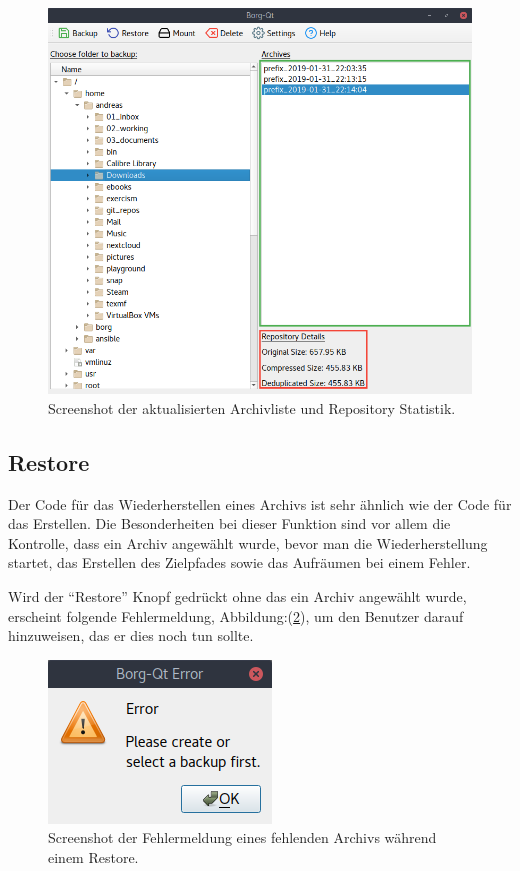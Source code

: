 \begin{figure}[htbp]
\centering
\includegraphics[width=.9\linewidth]{pictures/borgqt_archive_list.png}
\caption{\label{fig:org24ed7cf}
Screenshot der aktualisierten Archivliste und Repository Statistik.}
\end{figure}

\subsection{Restore}
\label{sec:org5c152c9}

Der Code für das Wiederherstellen eines Archivs ist sehr ähnlich wie der Code
für das Erstellen. Die Besonderheiten bei dieser Funktion sind vor allem die
Kontrolle, dass ein Archiv angewählt wurde, bevor man die Wiederherstellung
startet, das Erstellen des Zielpfades sowie das Aufräumen bei einem Fehler.

Wird der "`Restore"' Knopf gedrückt ohne das ein Archiv angewählt wurde, erscheint
folgende Fehlermeldung, Abbildung:(\ref{fig:org40b5f27}), um den Benutzer
darauf hinzuweisen, das er dies noch tun sollte.

\begin{figure}[H]
\centering
\includegraphics[width=.2\paperwidth]{pictures/borgqt_no_archive_selected.png}
\caption{\label{fig:org40b5f27}
Screenshot der Fehlermeldung eines fehlenden Archivs während einem Restore.}
\end{figure}

